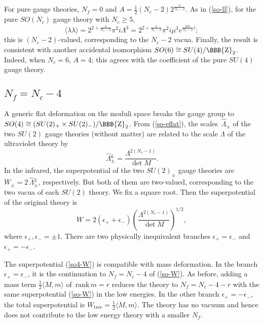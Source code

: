 \documentclass[lecture]{qft-l}
\newcommand{\eps}{\epsilon}
\newcommand{\lam}{\lambda}
\newcommand{\Lam}{\varLambda}
\newcommand{\ZZ}{{\mbox{\BBB{Z}}}}
\newcommand{\bra}{\langle}
\newcommand{\ket}{\rangle}
\newcommand{\inv}[1]{\frac{1}{#1}}
\newcommand{\hf}{{\textstyle \inv{2}}}
\newcommand{\e}[1]{e^{{#1}}}
\newcommand{\ii}{i}
\newcommand{\rank}{\mathrm{\,rank\,}}
\newcommand{\tree}{_\mathrm{tree}}
\newcommand{\hLam}{\,\hat{\!\Lam}{}}
\def\Subhead#1{\subsection*{#1}}
\begin{document}
For pure gauge theories, $N_f=0$ and $A=\hf(N_c-2)2^{\frac{4}{N_c-2}}$.
As in (\ref{so-ll}), for the pure $SO(N_c)$ gauge theory with $N_c\ge5$,
	\begin{equation}\label{so-ll}
\bra\lam\lam\ket=2^{2+\frac{4}{N_c-2}}\pi^2\ii\Lam^3
=2^{2+\frac{4}{N_c-2}}\pi^2\ii\mu^3\e{\frac{2\pi\ii}{N_c-2}\tau};
	\end{equation}
this is $(N_c-2)$-valued, corresponding to the $N_c-2$ vacua.
Finally, the result is consistent with another accidental isomorphism
$SO(6)\cong SU(4)/\ZZ_2$.
Indeed, when $N_c=6$, $A=4$;
this agrees with the coefficient of the pure $SU(4)$ gauge theory.


\Subhead{{\boldmath $N_f=N_c-4$}}

A generic flat deformation on the moduli space breaks the gauge group to 
$SO(4)\cong(SU(2)_+\times SU(2)_-)/\ZZ_2$.
{}From (\ref{so-eflat}), the scales $\hLam_\pm$ of the two $SU(2)$ gauge
theories (without matter) are related to the scale $\Lam$ of 
the ultraviolet theory by
	\begin{equation}
\hLam_\pm^6=\frac{\Lam^{2(N_c-1)}}{\det M}.
	\end{equation}
In the infrared, the superpotential of the two $SU(2)_\pm$ gauge theories are
$W_\pm=2\hLam_\pm^3$, respectively.
But both of them are two-valued, corresponding to the two vacua of
each $SU(2)$ theory.
We fix a square root.
Then the superpotential of the original theory is
	\begin{equation}\label{so4-W}
W=2(\eps_++\eps_-)\left(\frac{\Lam^{2(N_c-1)}}{\det M}\right)^{1/2},
	\end{equation}
where $\eps_+,\eps_-=\pm1$.
There are two physically inequivalent branches $\eps_+=\eps_-$ and
$\eps_+=-\eps_-$.

The superpotential (\ref{so4-W}) is compatible with mass deformation.
In the branch $\eps_+=\eps_-$, it is the continuation to $N_f=N_c-4$ of
(\ref{so-W}).
As before, adding a mass term $\hf\bra M,m\ket$ of $\rank m=r$
reduces the theory to $N_f=N_c-4-r$ with the same superpotential
(\ref{so-W}) in the low energies.
In the other branch $\eps_+=-\eps_-$, the total superpotential is 
$W\tree=\hf\bra M,m\ket$.
The theory has no vacuum and hence does not contribute to the low energy
theory with a smaller $N_f$.
\end{document}
